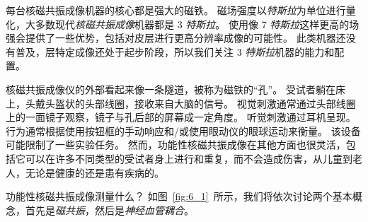每台核磁共振成像机器的核心都是强大的磁铁。
磁场强度以\textit{特斯拉}为单位进行量化，大多数现代\textit{核磁共振成像}机器都是 3 \textit{特斯拉}。
使用像 7 \textit{特斯拉}这样更高的场强会提供了一些优势，包括对皮层进行更高分辨率成像的可能性。
此类机器还没有普及，层特定成像还处于起步阶段，所以我们关注 3 \textit{特斯拉}机器的能力和配置。


核磁共振成像仪的外部看起来像一条隧道，被称为磁铁的“孔”。
受试者躺在床上，头戴头盔状的头部线圈，接收来自大脑的信号。
视觉刺激通常通过头部线圈上的一面镜子观察，镜子与孔后部的屏幕成一定角度。
听觉刺激通过耳机呈现。
行为通常根据使用按钮框的手动响应和/或使用眼动仪的眼球运动来衡量。
该设备可能限制了一些实验任务。
然而，功能性核磁共振成像在其他方面也很灵活，包括它可以在许多不同类型的受试者身上进行和重复，而不会造成伤害，从儿童到老人，无论是健康的还是患有疾病的。


功能性核磁共振成像测量什么？
如图~\ref{fig:6_1}~所示，我们将依次讨论两个基本概念，首先是\textit{磁共振}，然后是\textit{神经血管耦合}。


